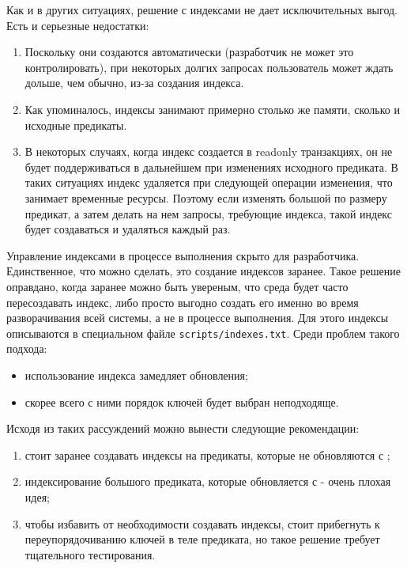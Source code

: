 Как и в других ситуациях, решение с индексами не дает исключительных выгод. Есть и серьезные недостатки:

\begin{enumerate}
  \item Поскольку они создаются автоматически (разработчик не может это контролировать), при некоторых долгих запросах пользователь может ждать дольше, чем обычно, из-за создания индекса.
  \item Как упоминалось, индексы занимают примерно столько же памяти, сколько и исходные предикаты.
  \item В некоторых случаях, когда индекс создается в readonly транзакциях, он не будет поддерживаться в дальнейшем при изменениях исходного предиката. В таких ситуациях индекс удаляется при следующей операции изменения, что занимает временные ресурсы. Поэтому если изменять большой по размеру предикат, а затем делать на нем запросы, требующие индекса, такой индекс будет создаваться и удаляться каждый раз.
\end{enumerate}

Управление индексами в процессе выполнения скрыто для разработчика. Единственное, что можно сделать, это создание индексов заранее. Такое решение оправдано, когда заранее можно быть увереным, что среда будет часто пересоздавать индекс, либо просто выгодно создать его именно во время разворачивания всей системы, а не в процессе выполнения. Для этого индексы описываются в специальном файле \lstinline{scripts/indexes.txt}. Среди проблем такого подхода:

\begin{itemize}
  \item использование индекса замедляет обновления;
  \item скорее всего с ними порядок ключей будет выбран неподходяще.
\end{itemize}

Исходя из таких рассуждений можно вынести следующие рекомендации:

\begin{enumerate}
  \item стоит заранее создавать индексы на предикаты, которые не обновляются с \ui;
  \item индексирование большого предиката, которые обновляется с \ui - очень плохая идея;
  \item чтобы избавить от необходимости создавать индексы, стоит прибегнуть к переупорядочиванию ключей в теле предиката, но такое решение требует тщательного тестирования.
\end{enumerate}


